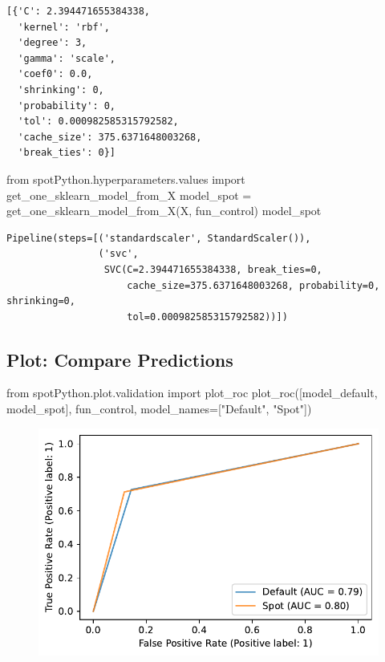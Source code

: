 \documentclass[
  letterpaper,
  DIV=11,
  numbers=noendperiod]{scrreprt}
\newenvironment{Shaded}{\begin{snugshade}}{\end{snugshade}}
\newcommand{\ImportTok}[1]{\textcolor[rgb]{0.00,0.46,0.62}{#1}}
\newcommand{\NormalTok}[1]{\textcolor[rgb]{0.00,0.23,0.31}{#1}}
\newcommand{\OperatorTok}[1]{\textcolor[rgb]{0.37,0.37,0.37}{#1}}
\newcommand{\StringTok}[1]{\textcolor[rgb]{0.13,0.47,0.30}{#1}}
\begin{document}
\begin{verbatim}
[{'C': 2.394471655384338,
  'kernel': 'rbf',
  'degree': 3,
  'gamma': 'scale',
  'coef0': 0.0,
  'shrinking': 0,
  'probability': 0,
  'tol': 0.000982585315792582,
  'cache_size': 375.6371648003268,
  'break_ties': 0}]
\end{verbatim}

\begin{Shaded}
\begin{Highlighting}[]
\ImportTok{from}\NormalTok{ spotPython.hyperparameters.values }\ImportTok{import}\NormalTok{ get\_one\_sklearn\_model\_from\_X}
\NormalTok{model\_spot }\OperatorTok{=}\NormalTok{ get\_one\_sklearn\_model\_from\_X(X, fun\_control)}
\NormalTok{model\_spot}
\end{Highlighting}
\end{Shaded}

\begin{verbatim}
Pipeline(steps=[('standardscaler', StandardScaler()),
                ('svc',
                 SVC(C=2.394471655384338, break_ties=0,
                     cache_size=375.6371648003268, probability=0, shrinking=0,
                     tol=0.000982585315792582))])
\end{verbatim}

\hypertarget{plot-compare-predictions}{%
\subsection{Plot: Compare Predictions}\label{plot-compare-predictions}}

\begin{Shaded}
\begin{Highlighting}[]
\ImportTok{from}\NormalTok{ spotPython.plot.validation }\ImportTok{import}\NormalTok{ plot\_roc}
\NormalTok{plot\_roc([model\_default, model\_spot], fun\_control, model\_names}\OperatorTok{=}\NormalTok{[}\StringTok{"Default"}\NormalTok{, }\StringTok{"Spot"}\NormalTok{])}
\end{Highlighting}
\end{Shaded}

\begin{figure}[H]

{\centering \includegraphics{10_spot_hpt_sklearn_classification_files/figure-pdf/cell-30-output-1.pdf}

}

\end{figure}
\end{document}
